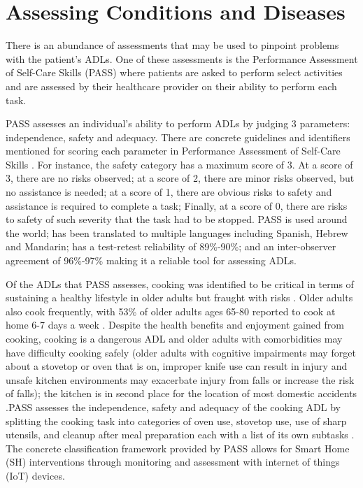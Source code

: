 
\section{Assessing Conditions and Diseases}

There is an abundance of assessments that may be used to pinpoint problems with the patient’s ADLs. One of these assessments is the Performance Assessment of Self-Care Skills (PASS) where patients are asked to perform select activities and are assessed by their healthcare provider on their ability to perform each task. 


PASS assesses an individual’s ability to perform ADLs by judging 3 parameters: independence, safety and adequacy. There are concrete guidelines and identifiers mentioned for scoring each parameter in Performance Assessment of Self-Care Skills \cite{rogers_performance_2014}. For instance, the safety category has a maximum score of 3. At a score of 3, there are no risks observed; at a score of 2, there are minor risks observed, but no assistance is needed; at a score of 1, there are obvious risks to safety and assistance is required to complete a task; Finally, at a score of 0, there are risks to safety of such severity that the task had to be stopped. PASS is used around the world; has been translated to multiple languages including Spanish, Hebrew and Mandarin; has a test-retest reliability of 89\%-90\%; and an inter-observer agreement of 96\%-97\% \cite{chisholm_evaluating_2014} making it a reliable tool for assessing ADLs. 


Of the ADLs that PASS assesses, cooking was identified to be critical in terms of sustaining a healthy lifestyle in older adults \cite{bouchard_smart_2020} but fraught with risks \cite{yared_cooking_2015}. Older adults also cook frequently, with 53\% of older adults ages 65-80 reported to cook at home 6-7 days a week \cite{malani_joy_2020}. Despite the health benefits and enjoyment gained from cooking, cooking is a dangerous ADL and older adults with comorbidities may have difficulty cooking safely (older adults with cognitive impairments may forget about a stovetop or oven that is on, improper knife use can result in injury and unsafe kitchen environments may exacerbate injury from falls or increase the risk of falls); the kitchen is in second place for the location of most domestic accidents \cite{yared_cooking_2015}.PASS assesses the independence, safety and adequacy of the cooking ADL by splitting the cooking task into categories of oven use, stovetop use, use of sharp utensils, and cleanup after meal preparation each with a list of its own subtasks \cite{rogers_performance_2014}. The concrete classification framework provided by PASS allows for Smart Home (SH) interventions through monitoring and assessment with internet of things (IoT) devices.

